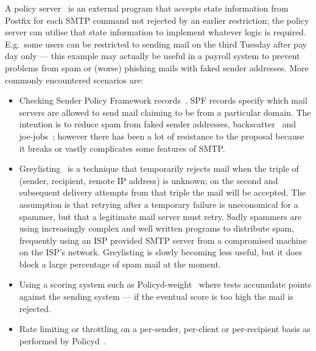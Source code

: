 \documentclass[a4paper,12pt,draft]{article}
\begin{document}
A policy server~\cite{policy-servers} is an external program that accepts
state information from Postfix for each SMTP command not rejected by an
earlier restriction; the policy server can utilise that state information
to implement whatever logic is required.  E.g.\ some users can be
restricted to sending mail on the third Tuesday after pay day only --- this
example may actually be useful in a payroll system to prevent problems from
spam or (worse) phishing mails with faked sender addresses.  More commonly
encountered scenarios are:

\begin{itemize}

    \item Checking Sender Policy Framework records~\cite{openspf,
        wikipedia-spf}.  SPF records specify which mail servers are allowed
        to send mail claiming to be from a particular domain.  The
        intention is to reduce spam from faked sender addresses,
        backscatter~\cite{postfix-backscatter} and
        joe-jobs~\cite{wikipedia-joe-job}; however there has been a lot of
        resistance to the proposal because it breaks or vastly complicates
        some features of SMTP\@.

    \item Greylisting~\cite{greylisting} is a technique that temporarily
        rejects mail when the triple of (sender, recipient, remote IP
        address) is unknown; on the second and subsequent delivery attempts
        from that triple the mail will be accepted.  The assumption is that
        retrying after a temporary failure is uneconomical for a spammer,
        but that a legitimate mail server must retry.  Sadly spammers are
        using increasingly complex and well written programs to distribute
        spam, frequently using an ISP provided SMTP server from a
        compromised machine on the ISP's network.  Greylisting is slowly
        becoming less useful, but it does block a large percentage of spam
        mail at the moment.

    \item Using a scoring system such as
        Policyd-weight~\cite{policyd-weight} where tests accumulate points
        against the sending system --- if the eventual score is too high
        the mail is rejected.
        
    \item Rate limiting or throttling on a per-sender, per-client or
        per-recipient basis as performed by Policyd~\cite{policyd}.

\end{itemize}
\end{document}
